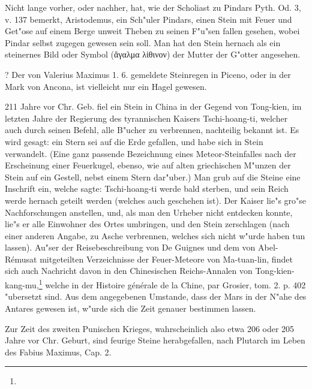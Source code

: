 \documentclass[a4paper, 11pt, oneside, polutonikogreek, german]{article}
\begin{document}
Nicht lange vorher, oder nachher, hat, wie der Scholiast zu Pindars Pyth. Od. 3, v. 137 bemerkt, Aristodemus, ein Sch"uler Pindars, einen Stein mit Feuer und Get"ose auf einem Berge unweit Theben zu seinen F"u"sen fallen gesehen, wobei Pindar selbst zugegen gewesen sein soll. Man hat den Stein hernach als ein steinernes Bild oder Symbol (ἅγαλμα λἱθινον) der Mutter der G"otter angesehen.

? Der von Valerius Maximus 1. 6. gemeldete Steinregen in Piceno, oder in der Mark von Ancona, ist vielleicht nur ein Hagel gewesen.

211 Jahre vor Chr. Geb. fiel ein Stein in China in der Gegend von Tong-kien, im letzten Jahre der Regierung des tyrannischen Kaisers Tschi-hoang-ti, welcher auch durch seinen Befehl, alle B"ucher zu verbrennen, nachteilig bekannt ist. Es wird gesagt: ein Stern sei auf die Erde gefallen, und habe sich in Stein verwandelt. (Eine ganz passende Bezeichnung eines Meteor-Steinfalles nach der Erscheinung einer Feuerkugel, ebenso, wie auf alten griechischen M"unzen der Stein auf ein Gestell, nebst einem Stern dar"uber.) Man grub auf die Steine eine Inschrift ein, welche sagte: Tschi-hoang-ti werde bald sterben, und sein Reich werde hernach geteilt werden (welches auch geschehen ist). Der Kaiser lie"s gro"se Nachforschungen anstellen, und, als man den Urheber nicht entdecken konnte, lie"s er alle Einwohner des Ortes umbringen, und den Stein zerschlagen (nach einer anderen Angabe, zu Asche verbrennen, welches sich nicht w"urde haben tun lassen). Au"ser der Reisebeschreibung von De Guignes und dem von Abel-Rémusat mitgeteilten Verzeichnisse der Feuer-Meteore von Ma-tuan-lin, findet sich auch Nachricht davon in den Chinesischen Reichs-Annalen von Tong-kien-kang-mu,\footnote{} welche in der Histoire générale de la Chine, par Grosier, tom. 2. p. 402 "ubersetzt sind. Aus dem angegebenen Umstande, dass der Mars in der N"ahe des Antares gewesen ist, w"urde sich die Zeit genauer bestimmen lassen.

Zur Zeit des zweiten Punischen Krieges, wahrscheinlich also etwa 206 oder 205 Jahre vor Chr. Geburt, sind feurige Steine herabgefallen, nach Plutarch im Leben des Fabius Maximus, Cap. 2.
\end{document}
